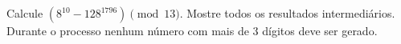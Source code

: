 Calcule $(8^10 - 128^1796) \pmod{13}$. Mostre todos os resultados intermediários. Durante o processo nenhum número com mais de 3 dígitos deve ser gerado.
